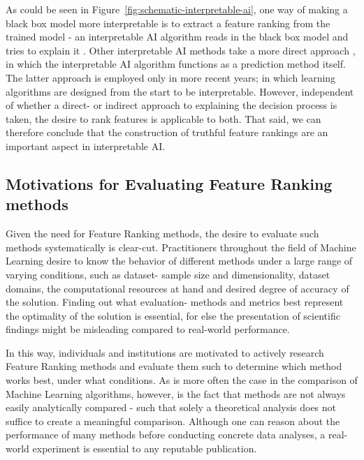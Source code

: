 \documentclass[../main.tex]{subfiles}
\begin{document}
As could be seen in Figure~\ref{fig:schematic-interpretable-ai}, one way of making a black box model more interpretable is to extract a feature ranking from the trained model - an interpretable AI algorithm reads in the black box model and tries to explain it \citep{lundberg_unified_2017}. Other interpretable AI methods take a more direct approach \citep{arik_tabnet_2020}, in which the interpretable AI algorithm functions as a prediction method itself. The latter approach is employed only in more recent years; in which learning algorithms are designed from the start to be interpretable. However, independent of whether a direct- or indirect approach to explaining the decision process is taken, the desire to rank features is applicable to both. That said, we can therefore conclude that the construction of truthful feature rankings are an important aspect in interpretable AI.




\subsection{Motivations for Evaluating Feature Ranking methods}
Given the need for Feature Ranking methods, the desire to evaluate such methods systematically is clear-cut. Practitioners throughout the field of Machine Learning desire to know the behavior of different methods under a large range of varying conditions, such as dataset- sample size and dimensionality, dataset domains, the computational resources at hand and desired degree of accuracy of the solution. Finding out what evaluation- methods and metrics best represent the optimality of the solution is essential, for else the presentation of scientific findings might be misleading compared to real-world performance.

In this way, individuals and institutions are motivated to actively research Feature Ranking methods and evaluate them such to determine which method works best, under what conditions. As is more often the case in the comparison of Machine Learning algorithms, however, is the fact that methods are not always easily analytically compared - such that solely a theoretical analysis does not suffice to create a meaningful comparison. Although one can reason about the performance of many methods before conducting concrete data analyses, a real-world experiment is essential to any reputable publication.



\biblio
\end{document}
